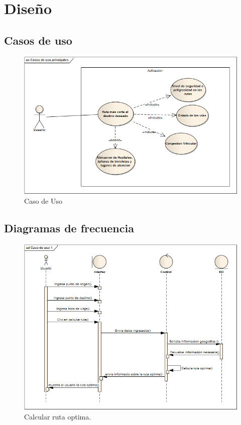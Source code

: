 \chapter{Diseño}


\section{Casos de uso}
\begin{figure}[th!]
	\centering
	\includegraphics[width=1\linewidth]{uml/Diagramas/CasosUso/Caso}
	\caption{Caso de Uso}
	\label{fig:caso1}
\end{figure}
\newpage

\section{Diagramas de frecuencia}
\begin{figure}[th!]
	\centering
	\includegraphics[width=1\linewidth]{uml/Diagramas/Sec/SecRutOpt}
	\caption{Calcular ruta optima.}
	\label{fig:Sec1}
\end{figure}
\newpage

